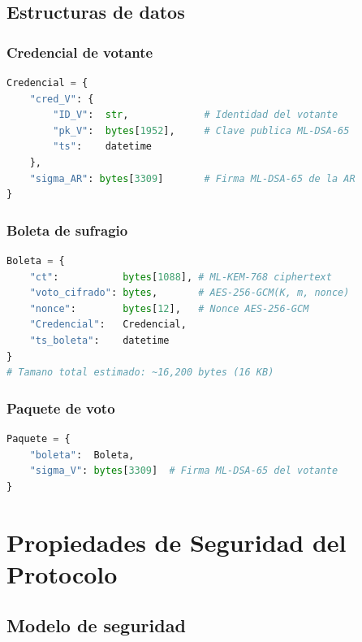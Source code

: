 \documentclass[12pt,a4paper,twoside,openright]{book}
\theoremstyle{plain}
\theoremstyle{definition}
\theoremstyle{remark}
\begin{document}
\section{Estructuras de datos}

\subsection{Credencial de votante}

\begin{lstlisting}[language=Python, caption={Credencial de votante}]
Credencial = {
    "cred_V": {
        "ID_V":  str,             # Identidad del votante
        "pk_V":  bytes[1952],     # Clave publica ML-DSA-65
        "ts":    datetime
    },
    "sigma_AR": bytes[3309]       # Firma ML-DSA-65 de la AR
}
\end{lstlisting}

\subsection{Boleta de sufragio}

\begin{lstlisting}[language=Python, caption={Boleta de sufragio}]
Boleta = {
    "ct":           bytes[1088], # ML-KEM-768 ciphertext
    "voto_cifrado": bytes,       # AES-256-GCM(K, m, nonce)
    "nonce":        bytes[12],   # Nonce AES-256-GCM
    "Credencial":   Credencial,
    "ts_boleta":    datetime
}
# Tamano total estimado: ~16,200 bytes (16 KB)
\end{lstlisting}

\subsection{Paquete de voto}

\begin{lstlisting}[language=Python, caption={Paquete de voto final}]
Paquete = {
    "boleta":  Boleta,
    "sigma_V": bytes[3309]  # Firma ML-DSA-65 del votante
}
\end{lstlisting}

\chapter{Propiedades de Seguridad del Protocolo}
\label{chap:seguridad}

\section{Modelo de seguridad}
\end{document}
